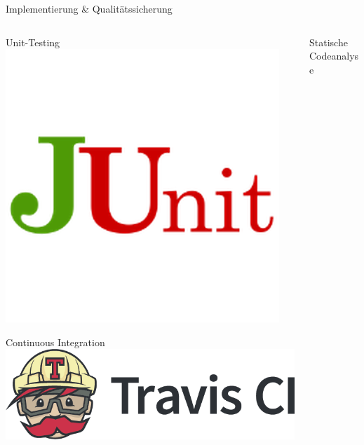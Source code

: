 \documentclass[xcolor=dvipsnames]{beamer}
\begin{document}
    \begin{frame}{Implementierung \& Qualitätssicherung}
        \begin{columns}
            \begin{column}{0.5\textwidth}
                \begin{block}{Unit-Testing}
                    \center
                    \includegraphics[width=(\textwidth / 3)]{img/junit.png}
                \end{block}
                \begin{block}{Continuous Integration}
                    \includegraphics[width=(\textwidth)]{img/travis.png}
                \end{block}
            \end{column}
            \begin{column}{0.5\textwidth}
                \begin{block}{Statische Codeanalyse}
                    \center

\end{block}
\end{column}
\end{columns}
\end{frame}
\end{document}
